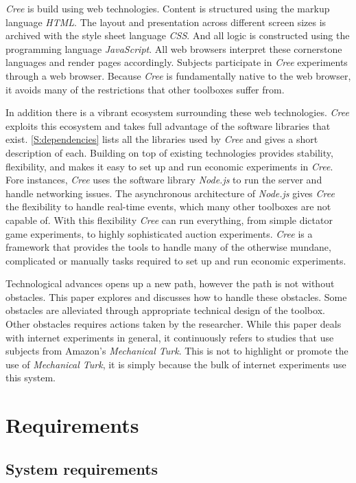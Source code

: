 \documentclass[preprint, 12pt]{elsarticle}
\newcommand{\Cree}{\emph{Cree}\xspace}
\begin{document}
\Cree is build using web technologies. Content is structured using the markup language \emph{HTML}. The layout and presentation across different screen sizes is archived with the style sheet language \emph{CSS}. And all logic is constructed using the programming language \emph{JavaScript}. All web browsers interpret these cornerstone languages and render pages accordingly. Subjects participate in \Cree experiments through a web browser. Because \Cree is fundamentally native to the web browser, it avoids many of the restrictions that other toolboxes suffer from.

In addition there is a vibrant ecosystem surrounding these web technologies. \Cree exploits this ecosystem and takes full advantage of the software libraries that exist. \ref{S:dependencies} lists all the libraries used by \Cree and gives a short description of each. Building on top of existing technologies provides stability, flexibility, and makes it easy to set up and run economic experiments in \Cree. Fore instances, \Cree uses the software library \emph{Node.js} to run the server and handle networking issues. The asynchronous architecture of \emph{Node.js} gives \Cree the flexibility to handle real-time events, which many other toolboxes are not capable of. With this flexibility \Cree can run everything, from simple dictator game experiments, to highly sophisticated auction experiments. \Cree is a framework that provides the tools to handle many of the otherwise mundane, complicated or manually tasks required to set up and run economic experiments.

Technological advances opens up a new path, however the path is not without obstacles. This paper explores and discusses how to handle these obstacles. Some obstacles are alleviated through appropriate technical design of the toolbox. Other obstacles requires actions taken by the researcher. While this paper deals with internet experiments in general, it continuously refers to studies that use subjects from Amazon's \emph{Mechanical Turk}. This is not to highlight or promote the use of \emph{Mechanical Turk}, it is simply because the bulk of internet experiments use this system.

\section{Requirements}
\label{S:Requirements}

\subsection{System requirements}
\end{document}
